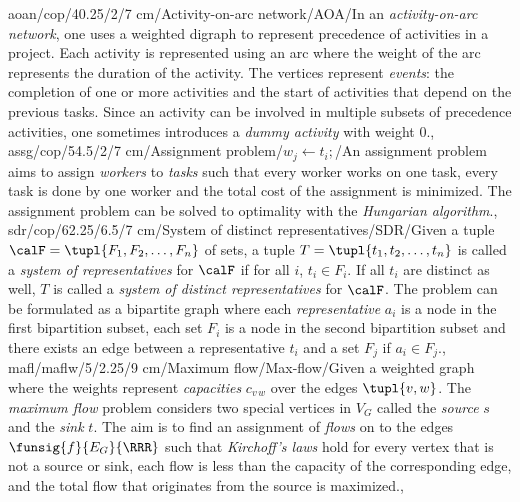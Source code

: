aoan/cop/40.25/2/7 cm/{Activity-on-arc network}/{AOA}/{In an \emph{activity-on-arc network}, one uses a weighted digraph to represent precedence of activities in a project. Each activity is represented using an arc where the weight of the arc represents the duration of the activity. The vertices represent \emph{events}: the completion of one or more activities and the start of activities that depend on the previous tasks. Since an activity can be involved in multiple subsets of precedence activities, one sometimes introduces a \emph{dummy activity} with weight $0$.},
assg/cop/54.5/2/7 cm/{Assignment problem}/{$w_j\leftarrow t_i;$}/{An assignment problem aims to assign \emph{workers} to \emph{tasks} such that every worker works on one task, every task is done by one worker and the total cost of the assignment is minimized. The assignment problem can be solved to optimality with the \emph{Hungarian algorithm}.},
sdr/cop/62.25/6.5/7 cm/{System of distinct representatives}/{SDR}/{Given a tuple $\calF=\tupl{F_1,F_2,\ldots,F_n}$ of sets, a tuple $T=\tupl{t_1,t_2,\ldots,t_n}$ is called a \emph{system of representatives} for $\calF$ if for all $i$, $t_i\in F_i$. If all $t_i$ are distinct as well, $T$ is called a \emph{system of distinct representatives} for $\calF$. The problem can be formulated as a bipartite graph where each \emph{representative} $a_i$ is a node in the first bipartition subset, each set $F_i$ is a node in the second bipartition subset and there exists an edge between a representative $t_i$ and a set $F_j$ if $a_i\in F_j$.},
mafl/maflw/5/2.25/9 cm/{Maximum flow}/{Max-flow}/{Given a weighted graph where the weights represent \emph{capacities} $c_{v\,w}$ over the edges $\tupl{v,w}$. The \emph{maximum flow} problem considers two special vertices in $V_G$ called the \emph{source} $s$ and the \emph{sink} $t$. The aim is to find an assignment of \emph{flows} on to the edges $\funsig{f}{E_G}{\RRR}$ such that \emph{Kirchoff's laws} hold for every vertex that is not a source or sink, each flow is less than the capacity of the corresponding edge, and the total flow that originates from the source is maximized.},
